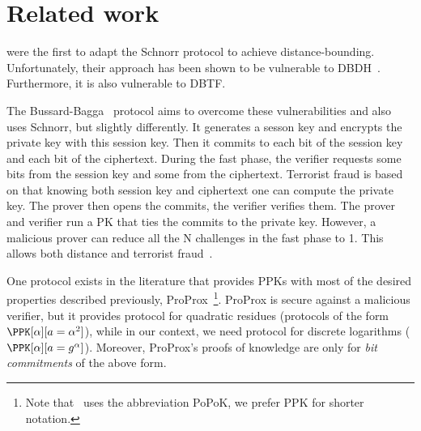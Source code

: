 \section{Related work}%
\label{related-work}

\textcite{DistanceBounding} were the first to adapt the Schnorr
protocol to achieve distance-bounding.
Unfortunately, their approach has been shown to be vulnerable to 
\ac{DBDH}~\cite{DistanceBounding,TamarinDB}.
Furthermore, it is also vulnerable to \ac{DBTF}.

The Bussard-Bagga~\cite{Bussard-Bagga} protocol aims to overcome these
vulnerabilities and also uses Schnorr, but slightly
differently. It generates a sesson key and encrypts the private key
with this session key. Then it commits to each bit of the session key
and each bit of the ciphertext. During the fast phase, the verifier requests some bits from the session key and some from the ciphertext. Terrorist fraud is based on that knowing both session key and ciphertext one can compute the private key.
The prover then opens the commits, the verifier verifies them.
The prover and verifier run a \ac{PK} that ties the commits to the private key.
However, a malicious prover can reduce all the N challenges in the fast phase
to 1. This allows both distance and terrorist
fraud~\cite{Bussard-Bagga-attack}.

One protocol exists in the literature that provides \acp{PPK} with most of the desired properties described previously, ProProx~\cite{ProProx}\footnote{Note that~\cite{ProProx} uses the abbreviation PoPoK, we prefer \acs{PPK} for shorter notation.}.
ProProx is secure against a malicious verifier, but it provides  
protocol for quadratic residues (\ie protocols of the form \(
  \PPK[\alpha][a = \alpha^2]
\)), while in our context, we need  protocol for discrete logarithms 
(\ie \(\PPK[\alpha][a = g^\alpha]\)). %
Moreover, ProProx's proofs of knowledge are only for \emph{bit commitments} of the 
above form. %

